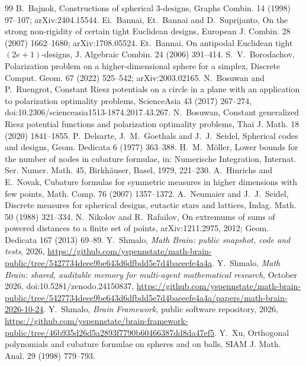 \documentclass[11pt]{article}
\theoremstyle{remark}
\begin{document}
\begin{thebibliography}{99}
 B.~Bajnok, Constructions of spherical $3$-designs, Graphs Combin. 14 (1998) 97--107; arXiv:2404.15544.
 Ei.~Bannai, Et.~Bannai and D.~Suprijanto, On the strong non-rigidity of certain tight Euclidean designs, European J. Combin. 28 (2007) 1662--1680; arXiv:1708.05524.
 Et.~Bannai, On antipodal Euclidean tight $(2e+1)$-designs, J. Algebraic Combin. 24 (2006) 391--414.
 S.~V.~Borodachov, Polarization problem on a higher-dimensional sphere for a simplex, Discrete Comput. Geom. 67 (2022) 525--542; arXiv:2003.02165.
 N.~Bosuwan and P.~Ruengrot, Constant Riesz potentials on a circle in a plane with an application to polarization optimality problems, ScienceAsia 43 (2017) 267--274, doi:10.2306/scienceasia1513-1874.2017.43.267.
 N.~Bosuwan, Constant generalized Riesz potential functions and polarization optimality problems, Thai J. Math. 18 (2020) 1841--1855.
 P.~Delsarte, J.~M.~Goethals and J.~J.~Seidel, Spherical codes and designs, Geom. Dedicata 6 (1977) 363--388.
 H.~M.~M\"oller, Lower bounds for the number of nodes in cubature formulae, in: Numerische Integration, Internat. Ser. Numer. Math. 45, Birkh\"auser, Basel, 1979, 221--230.
 A.~Hinrichs and E.~Novak, Cubature formulas for symmetric measures in higher dimensions with few points, Math. Comp. 76 (2007) 1357--1372.
 A.~Neumaier and J.~J.~Seidel, Discrete measures for spherical designs, eutactic stars and lattices, Indag. Math. 50 (1988) 321--334.
 N.~Nikolov and R.~Rafailov, On extremums of sums of powered distances to a finite set of points, arXiv:1211.2975, 2012; Geom. Dedicata 167 (2013) 69--89.
 Y.~Shmalo, \emph{Math Brain: public snapshot, code and tests}, 2026, \url{https://github.com/yspennstate/math-brain-public/tree/5427734deee9be643d6dfbdd5e7d4baeeefe4a4a}.
 Y.~Shmalo, \emph{Math Brain: shared, auditable memory for multi-agent mathematical research}, October 2026, doi:10.5281/zenodo.24150837, \url{https://github.com/yspennstate/math-brain-public/tree/5427734deee9be643d6dfbdd5e7d4baeeefe4a4a/papers/math-brain-2026-10-24}.
 Y.~Shmalo, \emph{Brain Framework}, public software repository, 2026, \url{https://github.com/yspennstate/brain-framework-public/tree/46b935d26d5a2893f7790b60466387dd8da47ef5}.
 Y.~Xu, Orthogonal polynomials and cubature formulae on spheres and on balls, SIAM J. Math. Anal. 29 (1998) 779--793.
\end{thebibliography}
\end{document}
